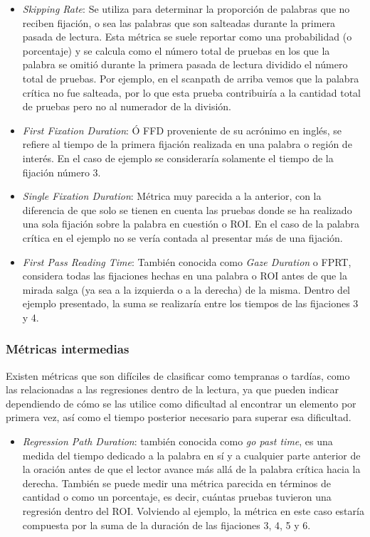 \begin{itemize}
    \item \textit{Skipping Rate}: Se utiliza para determinar la proporción de palabras que no reciben fijación, o sea las palabras que son salteadas durante la primera pasada de lectura. Esta métrica se suele reportar como una probabilidad (o porcentaje) y se calcula como el número total de pruebas en los que la palabra se omitió durante la primera pasada de lectura dividido el número total de pruebas. Por ejemplo, en el scanpath de arriba vemos que la palabra crítica no fue salteada, por lo que esta prueba contribuiría a la cantidad total de pruebas pero no al numerador de la división.
    \item \textit{First Fixation Duration}: Ó FFD proveniente de su acrónimo en inglés, se refiere al tiempo de la primera fijación realizada en una palabra o región de interés. En el caso de ejemplo se consideraría solamente el tiempo de la fijación número 3.
    \item \textit{Single Fixation Duration}: Métrica muy parecida a la anterior, con la diferencia de que solo se tienen en cuenta las pruebas donde se ha realizado una sola fijación sobre la palabra en cuestión o ROI. En el caso de la palabra crítica en el ejemplo no se vería contada al presentar más de una fijación.
    \item \textit{First Pass Reading Time}: También conocida como \textit{Gaze Duration} o FPRT, considera todas las fijaciones hechas en una palabra o ROI antes de que la mirada salga (ya sea a la izquierda o a la derecha) de la misma. Dentro del ejemplo presentado, la suma se realizaría entre los tiempos de las fijaciones 3 y 4.
\end{itemize}

\subsubsection{Métricas intermedias}

Existen métricas que son difíciles de clasificar como tempranas o tardías, como las relacionadas a las regresiones dentro de la lectura, ya que pueden indicar dependiendo de cómo se las utilice como dificultad al encontrar un elemento por primera vez, así como el tiempo posterior necesario para superar esa dificultad. \parencite{CliftonStaubRayner2007}

\begin{itemize}
    \item \textit{Regression Path Duration}: también conocida como \textit{go past time}, es una medida del tiempo dedicado a la palabra en sí y a cualquier parte anterior de la oración antes de que el lector avance más allá de la palabra crítica hacia la derecha. También se puede medir una métrica parecida en términos de cantidad o como un porcentaje, es decir, cuántas pruebas tuvieron una regresión dentro del ROI. Volviendo al ejemplo, la métrica en este caso estaría compuesta por la suma de la duración de las fijaciones 3, 4, 5 y 6.
\end{itemize}

